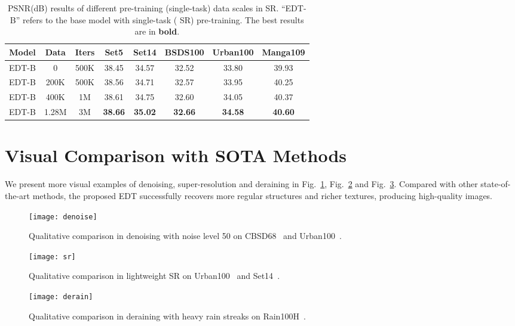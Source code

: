 \documentclass[runningheads]{llncs}
\begin{document}
	\begin{table}[t]
		\caption{PSNR(dB) results of different pre-training (single-task) data scales in  SR. ``EDT-B'' refers to the base model with single-task ( SR) pre-training. The best results are in \textbf{bold}.}
\setlength\tabcolsep{4pt}
		\begin{center}
\begin{tabular}{| c | c | c | c  c  c  c  c|}
				\hline
				Model & Data & Iters & Set5 & Set14 & BSDS100 & Urban100 & Manga109 \\
				\hline
				EDT-B & 0 & 500K & 38.45 & 34.57 & 32.52 & 33.80 & 39.93 \\
				\hline
				EDT-B & 200K & 500K & 38.56 & 34.71 & 32.57 & 33.95 & 40.25 \\
				EDT-B & 400K & 1M & 38.61 & 34.75 & 32.60 & 34.05 & 40.37 \\	
				EDT-B & 1.28M & 3M & \textbf{38.66} & \textbf{35.02} & \textbf{32.66} & \textbf{34.58} & \textbf{40.60} \\		
				\hline
			\end{tabular}
\end{center}
\vspace{-0.1in}
		\label{tab:full_data}
	\end{table} 
	
	


	\section{Visual Comparison with SOTA Methods}
	
	We present more visual examples of denoising, super-resolution and deraining in Fig.~\ref{fig:denoise}, Fig.~\ref{fig:sr} and Fig.~\ref{fig:derain}. Compared with other state-of-the-art methods, the proposed EDT successfully recovers more regular structures and richer textures, producing high-quality images.
	
	\begin{figure}[h]
		\begin{center}
			\texttt{[image: denoise]}
		\end{center}
		\caption{Qualitative comparison in denoising with noise level 50 on CBSD68~\cite{martin2001database} and Urban100~\cite{huang2015single}.}
		\label{fig:denoise}
	\end{figure}
	
	\begin{figure}[t]
		\begin{center}
			\texttt{[image: sr]}
		\end{center}
		\caption{Qualitative comparison in  lightweight SR on Urban100~\cite{huang2015single} and Set14~\cite{zeyde2010single}.}
		\label{fig:sr}
	\end{figure}
	
	\begin{figure}[t]
		\begin{center}
			\texttt{[image: derain]}
		\end{center}
		\caption{Qualitative comparison in deraining with heavy rain streaks on Rain100H~\cite{yang2019joint}.}
		\label{fig:derain}
	\end{figure}
\end{document}
